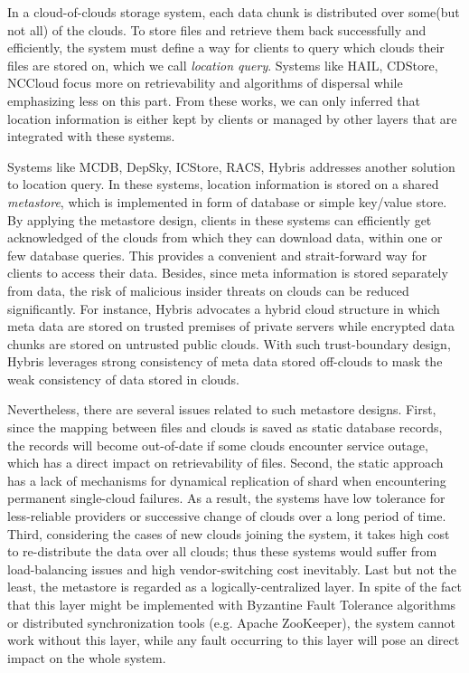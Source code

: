 In a cloud-of-clouds storage system, each data chunk is distributed over some(but not all) of the clouds. To store files and retrieve them back successfully and efficiently, the system must define a way for clients to query which clouds their files are stored on, which we call \textit{location query}. Systems like HAIL\cite{bowers2009hail}, CDStore\cite{li2015cdstore}, NCCloud\cite{hu2012nccloud} focus more on retrievability and algorithms of dispersal while emphasizing less on this part. From these works, we can only inferred that location information is either kept by clients or managed by other layers that are integrated with these systems.

Systems like MCDB\cite{alzain2011mcdb}, DepSky\cite{bessani2013depsky}, ICStore\cite{cachin2010dependable}, RACS\cite{abu2010racs}, Hybris\cite{dobre2014hybris} addresses another solution to location query. In these systems, location information is stored on a shared \textit{metastore}, which is implemented in form of database or simple key/value store. By applying the metastore design, clients in these systems can efficiently get acknowledged of the clouds from which they can download data, within one or few database queries. This provides a convenient and strait-forward way for clients to access their data. Besides, since meta information is stored separately from data, the risk of malicious insider threats on clouds can be reduced significantly. For instance, Hybris\cite{dobre2014hybris} advocates a hybrid cloud structure in which meta data are stored on trusted premises of private servers while encrypted data chunks are stored on untrusted public clouds. With such trust-boundary design, Hybris leverages strong consistency of meta data stored off-clouds to mask the weak consistency of data stored in clouds.

Nevertheless, there are several issues related to such metastore designs. First, since the mapping between files and clouds is saved as static database records, the records will become out-of-date if some clouds encounter service outage, which has a direct impact on retrievability of files. Second, the static approach has a lack of mechanisms for dynamical replication of shard when encountering permanent single-cloud failures. As a result, the systems have low tolerance for less-reliable providers or successive change of clouds over a long period of time. Third, considering the cases of new clouds joining the system, it takes high cost to re-distribute the data over all clouds; thus these systems would suffer from load-balancing issues and high vendor-switching cost inevitably. Last but not the least, the metastore is regarded as a logically-centralized layer. In spite of the fact that this layer might be implemented with Byzantine Fault Tolerance algorithms or distributed synchronization tools (e.g. Apache ZooKeeper\cite{zookeeper}), the system cannot work without this layer, while any fault occurring to this layer will pose an direct impact on the whole system.

